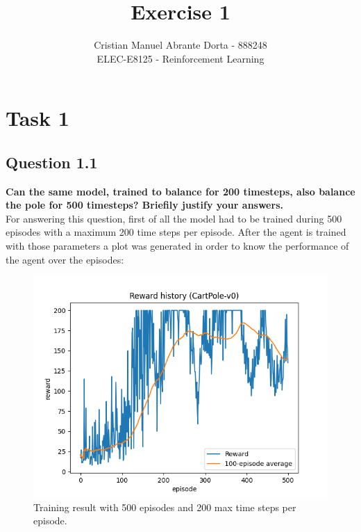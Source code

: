 \documentclass[12pt]{article}
\begin{document}
 
\title{Exercise 1}
\author{Cristian Manuel Abrante Dorta - 888248\\
ELEC-E8125 - Reinforcement Learning}

\maketitle
\section{Task 1}
\label{sec:task-1}

\subsection{Question 1.1}
\label{sec:question-1.1}
\textbf {
    Can the same model, trained to balance for 200 timesteps, also balance the pole for 500 timesteps? Briefily justify your answers.
}\\

For answering this question, first of all the model had to be trained during 500 episodes with a maximum 200 time steps per episode. After the agent is trained with those parameters a plot was generated in order to know the performance of the agent over the episodes:

\begin{figure}[ht]
    \centering
    \includegraphics[scale=0.5]{exercise-1/report/img/task-1-training-200.png}
    \caption{Training result with 500 episodes and 200 max time steps per episode.}
    \label{fig:training-200}
\end{figure}
\end{document}
